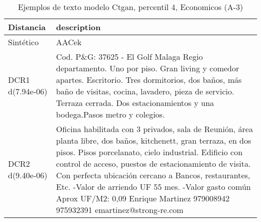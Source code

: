\begin{table}[H]
\centering
\fontsize{10}{14}\selectfont
\caption{Ejemplos de texto modelo Ctgan, percentil 4, Economicos (A-3)}
\label{table-example-economicos-a-3-ctgan-4p-text}
\begin{tabular}{|l|m{35em}|}
\hline
\rowcolor[gray]{0.8}
Distancia & description \\
\hline Sintético & AACek \\
\hline DCR1 d(7.94e-06) & Cod. P\&G: 37625 - El Golf Malaga Regio departamento. Uno por piso. Gran living y comedor apartes. Escritorio. Tres dormitorios, dos ba\~nos, m\'as ba\~no de visitas, cocina, lavadero, pieza de servicio. Terraza cerrada. Dos estacionamientos y una bodega.Pasos metro y colegios. \\
\hline DCR2 d(9.40e-06) & Oficina habilitada con 3 privados, sala de Reuni\'on, \'area planta libre, dos ba\~nos, kitchenett, gran terraza, en dos pisos. Pisos porcelanato, cielo industrial. Edificio con control de acceso, puestos de estacionamiento de visita. Con perfecta ubicaci\'on cercano a Bancos, restaurantes, Etc.  -Valor de arriendo UF 55 mes. -Valor gasto com\'un Aprox UF/M2: 0,09  Enrique Martinez 979008942 975932391 emartinez@strong-re.com \\
\hline
\end{tabular}
\end{table}
